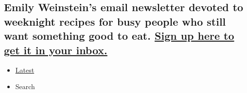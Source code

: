 \hypertarget{emily-weinsteins-email-newsletter-devoted-to-weeknight-recipes-for-busy-people-who-still-want-something-good-to-eat-sign-up-here-to-get-it-in-your-inbox-1}{%
\subsection{\texorpdfstring{Emily Weinstein's email newsletter devoted
to weeknight recipes for busy people who still want something good to
eat.
\href{https://www.nytimes3xbfgragh.onion/newsletters/five-weeknight-dishes}{Sign
up here to get it in your
inbox.}}{Emily Weinstein's email newsletter devoted to weeknight recipes for busy people who still want something good to eat. Sign up here to get it in your inbox.}}\label{emily-weinsteins-email-newsletter-devoted-to-weeknight-recipes-for-busy-people-who-still-want-something-good-to-eat-sign-up-here-to-get-it-in-your-inbox-1}}

\begin{itemize}
\tightlist
\item
  \protect\hyperlink{stream-panel}{Latest}
\item
  Search
\end{itemize}

